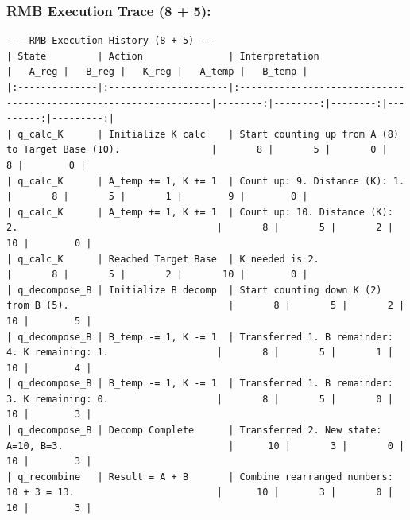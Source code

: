 \documentclass[11pt]{article}
\begin{document}
\subsubsection*{RMB Execution Trace (8 + 5):}
\begin{verbatim}
--- RMB Execution History (8 + 5) ---
| State         | Action               | Interpretation                                                   |   A_reg |   B_reg |   K_reg |   A_temp |   B_temp |
|:--------------|:---------------------|:-----------------------------------------------------------------|--------:|--------:|--------:|---------:|---------:|
| q_calc_K      | Initialize K calc    | Start counting up from A (8) to Target Base (10).                |       8 |       5 |       0 |        8 |        0 |
| q_calc_K      | A_temp += 1, K += 1  | Count up: 9. Distance (K): 1.                                    |       8 |       5 |       1 |        9 |        0 |
| q_calc_K      | A_temp += 1, K += 1  | Count up: 10. Distance (K): 2.                                   |       8 |       5 |       2 |       10 |        0 |
| q_calc_K      | Reached Target Base  | K needed is 2.                                                   |       8 |       5 |       2 |       10 |        0 |
| q_decompose_B | Initialize B decomp  | Start counting down K (2) from B (5).                            |       8 |       5 |       2 |       10 |        5 |
| q_decompose_B | B_temp -= 1, K -= 1  | Transferred 1. B remainder: 4. K remaining: 1.                   |       8 |       5 |       1 |       10 |        4 |
| q_decompose_B | B_temp -= 1, K -= 1  | Transferred 1. B remainder: 3. K remaining: 0.                   |       8 |       5 |       0 |       10 |        3 |
| q_decompose_B | Decomp Complete      | Transferred 2. New state: A=10, B=3.                             |      10 |       3 |       0 |       10 |        3 |
| q_recombine   | Result = A + B       | Combine rearranged numbers: 10 + 3 = 13.                         |      10 |       3 |       0 |       10 |        3 |
\end{verbatim}

\printbibliography
\end{document}
